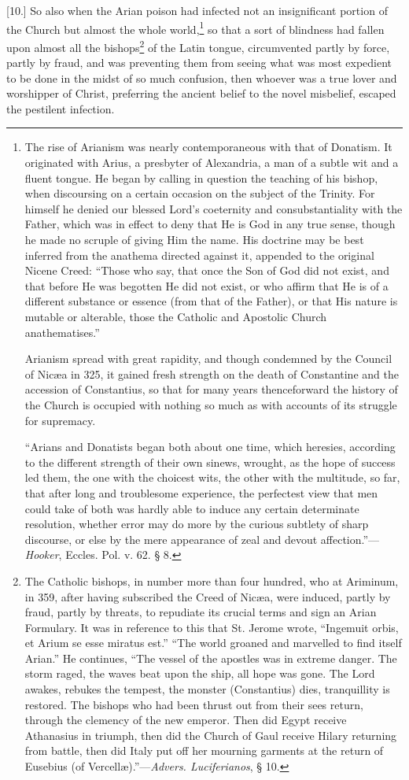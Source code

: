 [10.] So also when the Arian poison had infected not an insignificant portion of the Church but almost the whole world,\footnote{The rise of Arianism was nearly contemporaneous with that of Donatism. It originated with Arius, a presbyter of Alexandria, a man of a subtle wit and a fluent tongue. He began by calling in question the teaching of his bishop, when discoursing on a certain occasion on the subject of the Trinity. For himself he denied our blessed Lord’s coeternity and consubstantiality with the Father, which was in effect to deny that He is God in any true sense, though he made no scruple of giving Him the name. His doctrine may be best inferred from the anathema directed against it, appended to the original Nicene Creed: “Those who say, that once the Son of God did not exist, and that before He was begotten He did not exist, or who affirm that He is of a different substance or essence (from that of the Father), or that His nature is mutable or alterable, those the Catholic and Apostolic Church anathematises.” \par Arianism spread with great rapidity, and though condemned by the Council of Nicæa in 325, it gained fresh strength on the death of Constantine and the accession of Constantius, so that for many years thenceforward the history of the Church is occupied with nothing so much as with accounts of its struggle for supremacy. \par “Arians and Donatists began both about one time, which heresies, according to the different strength of their own sinews, wrought, as the hope of success led them, the one with the choicest wits, the other with the multitude, so far, that after long and troublesome experience, the perfectest view that men could take of both was hardly able to induce any certain determinate resolution, whether error may do more by the curious subtlety of sharp discourse, or else by the mere appearance of zeal and devout affection.”—\emph{Hooker}, Eccles. Pol. v. 62. § 8.} so that a sort of blindness had fallen upon almost all the bishops\footnote{The Catholic bishops, in number more than four hundred, who at Ariminum, in 359, after having subscribed the Creed of Nicæa, were induced, partly by fraud, partly by threats, to repudiate its crucial terms and sign an Arian Formulary. It was in reference to this that St. Jerome wrote, “Ingemuit orbis, et Arium se esse miratus est.” “The world groaned and marvelled to find itself Arian.” He continues, “The vessel of the apostles was in extreme danger. The storm raged, the waves beat upon the ship, all hope was gone. The Lord awakes, rebukes the tempest, the monster (Constantius) dies, tranquillity is restored. The bishops who had been thrust out from their sees return, through the clemency of the new emperor. Then did Egypt receive Athanasius in triumph, then did the Church of Gaul receive Hilary returning from battle, then did Italy put off her mourning garments at the return of Eusebius (of Vercellæ).”—\emph{Advers. Luciferianos}, § 10.} of the Latin tongue, circumvented partly by force, partly by fraud, and was preventing them from seeing what was most expedient to be done in the midst of so much confusion, then whoever was a true lover and worshipper of Christ, preferring the ancient belief to the novel misbelief, escaped the pestilent infection.

